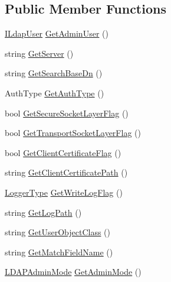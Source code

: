 \subsection*{Public Member Functions}
\begin{DoxyCompactItemize}
\item 
\hyperlink{interface_l_d_a_p_library_1_1_interfarces_1_1_i_ldap_user}{I\+Ldap\+User} \hyperlink{class_l_d_a_p_library_1_1_ldap_config_repository_a267f26a77a9f88dacda920a3627097f4}{Get\+Admin\+User} ()
\item 
string \hyperlink{class_l_d_a_p_library_1_1_ldap_config_repository_aa571589e5bc057e67af97898ec9b445d}{Get\+Server} ()
\item 
string \hyperlink{class_l_d_a_p_library_1_1_ldap_config_repository_a81de9f7bbba70b3733eb5294198eac67}{Get\+Search\+Base\+Dn} ()
\item 
Auth\+Type \hyperlink{class_l_d_a_p_library_1_1_ldap_config_repository_aa5fcfea3fdc2294b532bebf7b312d050}{Get\+Auth\+Type} ()
\item 
bool \hyperlink{class_l_d_a_p_library_1_1_ldap_config_repository_ab2fd6ed6d86bff36f7b7d2c38af58a1a}{Get\+Secure\+Socket\+Layer\+Flag} ()
\item 
bool \hyperlink{class_l_d_a_p_library_1_1_ldap_config_repository_a550614c9d98ffd3faf9d6f899cd2b742}{Get\+Transport\+Socket\+Layer\+Flag} ()
\item 
bool \hyperlink{class_l_d_a_p_library_1_1_ldap_config_repository_aa4970d1628065d7ebbd0ff77b122b36e}{Get\+Client\+Certificate\+Flag} ()
\item 
string \hyperlink{class_l_d_a_p_library_1_1_ldap_config_repository_a089c164784a54bb46207d27f991cb4a0}{Get\+Client\+Certificate\+Path} ()
\item 
\hyperlink{namespace_l_d_a_p_library_1_1_logger_a398123fc2bb2443d0e0821044d077795}{Logger\+Type} \hyperlink{class_l_d_a_p_library_1_1_ldap_config_repository_af6c64e056a1b7b835815388fe9b5e88b}{Get\+Write\+Log\+Flag} ()
\item 
string \hyperlink{class_l_d_a_p_library_1_1_ldap_config_repository_a56d63bbf67e3f9424f7447773a7c0bd9}{Get\+Log\+Path} ()
\item 
string \hyperlink{class_l_d_a_p_library_1_1_ldap_config_repository_abc62eeccfe7edd613048befa27159d41}{Get\+User\+Object\+Class} ()
\item 
string \hyperlink{class_l_d_a_p_library_1_1_ldap_config_repository_a90c1ff69830ff68a26d5f05deb29bbc5}{Get\+Match\+Field\+Name} ()
\item 
\hyperlink{namespace_l_d_a_p_library_1_1_enums_aaaf5c3ff906b84752d719f58d502f15e}{L\+D\+A\+P\+Admin\+Mode} \hyperlink{class_l_d_a_p_library_1_1_ldap_config_repository_abec1034ddd6ca6cd8a9f6f372eed3a18}{Get\+Admin\+Mode} ()

\end{DoxyCompactItemize}
